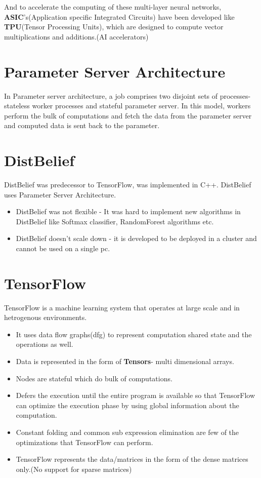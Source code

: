 \documentclass[twoside]{article}
\begin{document}
And to accelerate the computing of these multi-layer neural networks, \textbf{ASIC}'s(Application specific Integrated Circuits) have been developed like \textbf{TPU}(Tensor Processing Units), which are designed to compute vector multiplications and additions.(AI accelerators)

\section{Parameter Server Architecture}

In Parameter server architecture, a job comprises two disjoint sets of processes- stateless worker processes and stateful parameter server. In this model, workers perform the bulk of computations and fetch the data from the parameter server and computed data is sent back to the parameter.

\section{DistBelief}

DistBelief was predecessor to TensorFlow, was implemented in C++. DistBelief uses Parameter Server Architecture.

\begin{itemize}
\item DistBelief was not flexible - It was hard to implement new algorithms in DistBelief like Softmax classifier, RandomForest algorithms etc.
\item DistBelief doesn't scale down - it is developed to be deployed in a cluster and cannot be used on a single pc.
\end{itemize}

\section{TensorFlow}
TensorFlow is a machine learning system that operates at large scale and in hetrogenous environments. 
\begin{itemize}
\item It uses data flow graphs(dfg) to represent computation shared state and the operations as well.
\item Data is represented in the form of \textbf{Tensors}- multi dimensional arrays.
\item Nodes are stateful which do bulk of computations.
\item Defers the execution until the entire program is available so that TensorFlow can optimize the execution phase by using global information about the computation.
\item Constant folding and common sub expression elimination are few of the optimizations that TensorFlow can perform.
\item TensorFlow represents the data/matrices in the form of the dense matrices only.(No support for sparse matrices)
\end{itemize}
\end{document}
